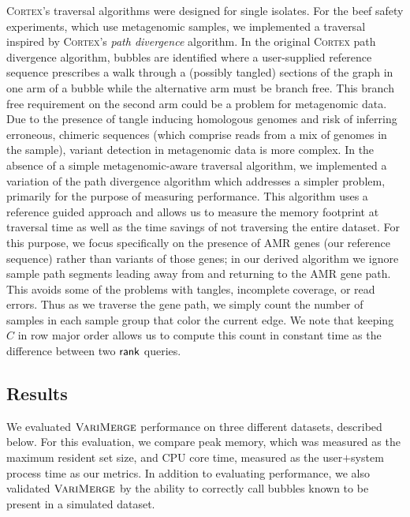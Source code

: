 \textsc{Cortex}'s traversal algorithms were designed for single isolates. For the beef safety experiments, which use metagenomic samples, we implemented a traversal inspired by \textsc{Cortex}'s \emph{path divergence} algorithm.  In the original \textsc{Cortex} path divergence algorithm, bubbles are identified where a user-supplied reference sequence prescribes a walk through a (possibly tangled) sections of the graph in one arm of a bubble while the alternative arm must be branch free.  This branch free requirement on the second arm could be a problem for metagenomic data. Due to the presence of tangle inducing homologous genomes and risk of inferring erroneous, chimeric sequences (which comprise reads from a mix of genomes in the sample), variant detection in metagenomic data is more complex. In the absence of a simple metagenomic-aware traversal algorithm, we implemented a variation of the path divergence algorithm which addresses a simpler problem, primarily for the purpose of measuring performance.  This algorithm uses a reference guided approach and allows us to measure the memory footprint at traversal time as well as the time savings of not traversing the entire dataset.  For this purpose, we focus specifically on the presence of AMR genes (our reference sequence) rather than variants of those genes; in our derived algorithm we ignore sample path segments leading away from and returning to the AMR gene path.  This avoids some of the problems with tangles, incomplete coverage, or read errors.  Thus as we traverse the gene path, we simply count the number of samples in each sample group that color the current edge.   We note that keeping $C$ in row major order allows us to compute this count in constant time as the difference between two $\textsf{rank}$ queries.











\subsection{Results}
\label{sec:results}
We evaluated $\mbox{\rm {\sc VariMerge}}$ performance on three different datasets, described below.  For this evaluation, we compare peak memory, which was measured as the maximum resident set size, and CPU core time, measured as the user$+$system process time as our metrics.  In addition to evaluating performance, we also validated $\mbox{\rm {\sc VariMerge}}$ by the ability to correctly call bubbles known to be present in a simulated dataset.

